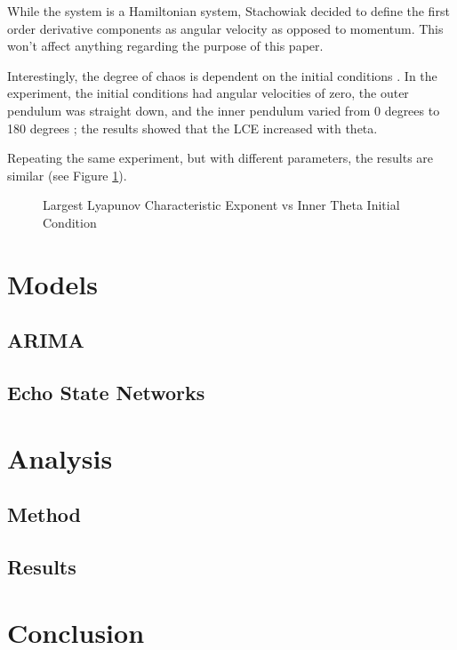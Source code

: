 \documentclass{article}
\begin{document}
While the system is a Hamiltonian system, Stachowiak decided to define the first order 
derivative components as angular velocity as opposed to momentum. This won't affect
anything regarding the purpose of this paper.

Interestingly, the 
degree of chaos is dependent on the initial conditions \cite{levien1993double}. 
In the experiment, the initial conditions had angular velocities of zero, the outer 
pendulum was straight down, and the inner pendulum varied from 0 degrees to 180 degrees 
\cite{levien1993double}; the results showed that the LCE increased with theta. 

Repeating the same experiment, but with different parameters, the results are similar (see 
Figure \ref{fig:doub_pend_energy}).

\begin{figure}[H]
    \centering
    \caption{Largest Lyapunov Characteristic Exponent vs Inner Theta Initial Condition}
    \label{fig:doub_pend_energy}
\end{figure}



\section{Models}

\subsection{ARIMA}
\subsection{Echo State Networks}

\section{Analysis}

\subsection{Method}
\subsection{Results}

\section{Conclusion}



\end{document}

